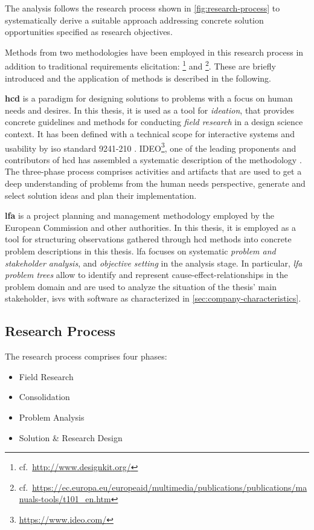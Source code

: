 The analysis follows the research process shown in \cref{fig:research-process} to systematically derive a suitable approach addressing concrete solution opportunities specified as research objectives.

Methods from two methodologies have been employed in this research process in addition to traditional requirements elicitation:  \footnote{cf.~\url{http://www.designkit.org/}} and \footnote{cf.~\url{https://ec.europa.eu/europeaid/multimedia/publications/publications/manuals-tools/t101\_en.htm}}.
These are briefly introduced and the application of methods is described in the following.

\textbf{\gls{hcd}} is a paradigm for designing solutions to problems with a focus on human needs and desires.
In this thesis, it is used as a tool for \emph{ideation}, that provides concrete guidelines and methods for conducting \emph{field research} in a design science context.
It has been defined with a technical scope for interactive systems and usability by \gls{iso} standard 9241-210 \autocite{ISO9241-210HCD}.
IDEO\footnote{\url{https://www.ideo.com/}}, one of the leading proponents and contributors of \gls{hcd} has assembled a systematic description of the methodology \autocite{HCD2015}.
The three-phase process comprises activities and artifacts that are used to get a deep understanding of problems from the human needs perspective, generate and select solution ideas and plan their implementation.

\textbf{\gls{lfa}} is a project planning and management methodology employed by the European Commission \autocite{Commission2004PCM} and other authorities.
In this thesis, it is employed as a tool for structuring observations gathered through \gls{hcd} methods into concrete problem descriptions in this thesis.
\gls{lfa} focuses on systematic \emph{problem and stakeholder analysis}, and \emph{objective setting} in the analysis stage.
In particular, \emph{\gls{lfa} problem trees} allow to identify and represent cause-effect-relationships in the problem domain and are used to analyze the situation of the thesis' main stakeholder, \glspl{isv} with  software as characterized in \cref{sec:company-characteristics}.

\hypertarget{sec:research-process}{%
\subsection{Research Process}\label{sec:research-process}}
The research process comprises four phases:
\begin{itemize}
\item Field Research
\item Consolidation
\item Problem Analysis
\item Solution \& Research Design
\end{itemize}

